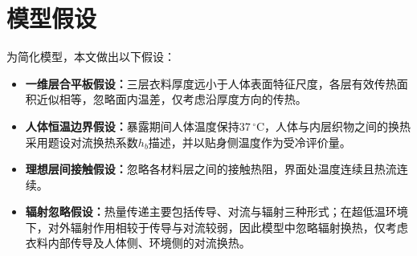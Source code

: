 \section{模型假设}

为简化模型，本文做出以下假设：

\begin{itemize}[label=\textbullet,leftmargin=3em,labelsep=0.75em,itemsep=0.25ex,topsep=0.25ex]
\item \textbf{一维层合平板假设：}三层衣料厚度远小于人体表面特征尺度，各层有效传热面积近似相等，忽略面内温差，仅考虑沿厚度方向的传热。

\item \textbf{人体恒温边界假设：}暴露期间人体温度保持$37\,^{\circ}\mathrm C$，人体与内层织物之间的换热采用题设对流换热系数$h_b$描述，并以贴身侧温度作为受冷评价量。

\item \textbf{理想层间接触假设：}忽略各材料层之间的接触热阻，界面处温度连续且热流连续。

\item \textbf{辐射忽略假设：}热量传递主要包括传导、对流与辐射三种形式；在超低温环境下，对外辐射作用相较于传导与对流较弱，因此模型中忽略辐射换热，仅考虑衣料内部传导及人体侧、环境侧的对流换热。
\end{itemize}